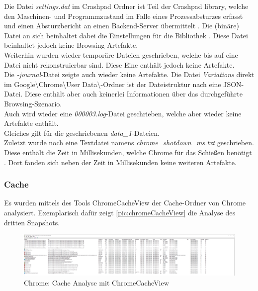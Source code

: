 \begin{appendices}

Die Datei \textit{settings.dat} im Crashpad Ordner ist Teil der Crashpad library, welche den Maschinen- und Programmzustand im Falle eines Prozessabsturzes erfasst und einen Absturzbericht an einen Backend-Server übermittelt \cite{CrashpadOverviewDesign}. Die (binäre) Datei an sich beinhaltet dabei die Einstellungen für die Bibliothek \cite{CrashpadOverviewDesign}. Diese Datei beinhaltet jedoch keine Browsing-Artefakte. \\
Weiterhin wurden wieder temporäre Dateien geschrieben, welche bis auf eine Datei nicht rekonstruierbar sind. Diese Eine enthält jedoch keine Artefakte. \\
Die \textit{-journal}-Datei zeigte auch wieder keine Artefakte.
Die Datei \textit{Variations} direkt im Google\textbackslash{}Chrome\textbackslash{}User Data\textbackslash{}-Ordner ist der Dateistruktur nach eine JSON-Datei. Diese enthält aber auch keinerlei Informationen über das durchgeführte Browsing-Szenario.\\
Auch wird wieder eine \textit{000003.log}-Datei geschrieben, welche aber wieder keine Artefakte enthält.\\
Gleiches gilt für die geschriebenen \textit{data\_1}-Dateien.\\
Zuletzt wurde noch eine Textdatei namens \textit{chrome\_shotdown\_ms.txt} geschrieben. Diese enthält die Zeit in Millisekunden, welche Chrome für das Schießen benötigt \cite{ChromiumShutdownMSTxtWebpageDoku}. Dort fanden sich neben der Zeit in Millisekunden keine weiteren Artefakte.

\subsubsection*{Cache}\label{chap:anhang-chrome-common-cache}
Es wurden mittels des Tools ChromeCacheView der Cache-Ordner von Chrome analysiert. Exemplarisch dafür zeigt \autoref{pic:chromeCacheView} die Analyse des dritten Snapshots.

\begin{figure}[h!]
	\centering
	\includegraphics[width=\textwidth]{bilder/ChromeCache.png}
	\caption{Chrome: Cache Analyse mit ChromeCacheView}
	\label{pic:chromeCacheView}
\end{figure}


\end{appendices}

